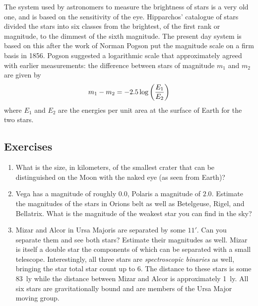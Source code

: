 The system used by astronomers to measure the brightness of stars is a
very old one, and is based on the sensitivity of the eye. Hipparchos'
catalogue of stars divided the stars into six classes from the
brightest, of the first rank or magnitude, to the dimmest of the sixth
magnitude. The present day system is based on this after the work of
Norman Pogson put the magnitude scale on a firm basis in 1856. Pogson
suggested a logarithmic scale that approximately agreed with earlier
measurements: the difference between stars of magnitude $m_1$ and
$m_2$ are given by 
\[
m_1-m_2=-2.5\log\left({E_1\over E_2}\right)
\]
where $E_1$ and $E_2$ are the energies per unit area at the surface of
Earth for the two stars.

\subsection{Exercises}

\begin{enumerate}
\item What is the size, in kilometers, of the smallest crater that can be distinguished on 
the Moon with the naked eye (as seen from Earth)?
\item Vega has a magnitude of roughly $0.0$, Polaris a magnitude of $2.0$. 
Estimate the magnitudes of the stars in Orions belt as well as Betelgeuse,
Rigel, and Bellatrix. What is the magnitude of the weakest star you can find
in the sky? 
\item Mizar and Alcor in Ursa Majoris are separated by some $11'$.
 Can you separate them and see both stars? Estimate their magnitudes
 as well. Mizar is itself a double star the components of which can be
 separated with a small telescope. Interestingly, all three stars are
 {\it spectroscopic binaries} as well, bringing the star total star
 count up to 6. The distance to these stars is some 83~ly while the
 distance between Mizar and Alcor is approximately
 1~ly. All six stars are  gravitationally bound and are
 members of the Ursa Major moving group.
\end{enumerate}

%
